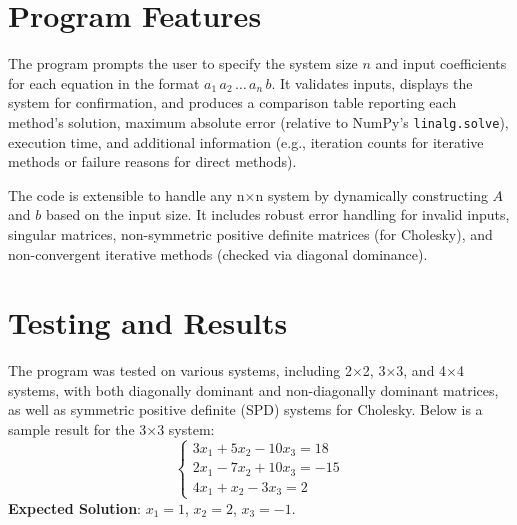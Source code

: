 \documentclass[12pt]{article}
\begin{document}
\section{Program Features}
The program prompts the user to specify the system size $n$ and input coefficients for each equation in the format $a_1 \, a_2 \, \dots \, a_n \, b$. It validates inputs, displays the system for confirmation, and produces a comparison table reporting each method’s solution, maximum absolute error (relative to NumPy’s \texttt{linalg.solve}), execution time, and additional information (e.g., iteration counts for iterative methods or failure reasons for direct methods).

The code is extensible to handle any n$\times$n system by dynamically constructing $A$ and $b$ based on the input size. It includes robust error handling for invalid inputs, singular matrices, non-symmetric positive definite matrices (for Cholesky), and non-convergent iterative methods (checked via diagonal dominance).

\section{Testing and Results}
The program was tested on various systems, including 2$\times$2, 3$\times$3, and 4$\times$4 systems, with both diagonally dominant and non-diagonally dominant matrices, as well as symmetric positive definite (SPD) systems for Cholesky. Below is a sample result for the 3$\times$3 system:
\[
\begin{cases}
3x_1 + 5x_2 - 10x_3 = 18 \\
2x_1 - 7x_2 + 10x_3 = -15 \\
4x_1 + x_2 - 3x_3 = 2
\end{cases}
\]
\textbf{Expected Solution}: $x_1 = 1$, $x_2 = 2$, $x_3 = -1$.
\end{document}
